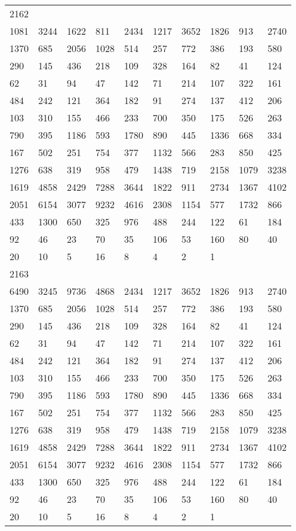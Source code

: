 \begin{longtable}{*{10}{l}}
2162&&&&&&&&&\\
1081& 3244& 1622& 811& 2434& 1217& 3652& 1826& 913& 2740\\
1370& 685& 2056& 1028& 514& 257& 772& 386& 193& 580\\
290& 145& 436& 218& 109& 328& 164& 82& 41& 124\\
62& 31& 94& 47& 142& 71& 214& 107& 322& 161\\
484& 242& 121& 364& 182& 91& 274& 137& 412& 206\\
103& 310& 155& 466& 233& 700& 350& 175& 526& 263\\
790& 395& 1186& 593& 1780& 890& 445& 1336& 668& 334\\
167& 502& 251& 754& 377& 1132& 566& 283& 850& 425\\
1276& 638& 319& 958& 479& 1438& 719& 2158& 1079& 3238\\
1619& 4858& 2429& 7288& 3644& 1822& 911& 2734& 1367& 4102\\
2051& 6154& 3077& 9232& 4616& 2308& 1154& 577& 1732& 866\\
433& 1300& 650& 325& 976& 488& 244& 122& 61& 184\\
92& 46& 23& 70& 35& 106& 53& 160& 80& 40\\
20& 10& 5& 16& 8& 4& 2& 1& \\

2163&&&&&&&&&\\
6490& 3245& 9736& 4868& 2434& 1217& 3652& 1826& 913& 2740\\
1370& 685& 2056& 1028& 514& 257& 772& 386& 193& 580\\
290& 145& 436& 218& 109& 328& 164& 82& 41& 124\\
62& 31& 94& 47& 142& 71& 214& 107& 322& 161\\
484& 242& 121& 364& 182& 91& 274& 137& 412& 206\\
103& 310& 155& 466& 233& 700& 350& 175& 526& 263\\
790& 395& 1186& 593& 1780& 890& 445& 1336& 668& 334\\
167& 502& 251& 754& 377& 1132& 566& 283& 850& 425\\
1276& 638& 319& 958& 479& 1438& 719& 2158& 1079& 3238\\
1619& 4858& 2429& 7288& 3644& 1822& 911& 2734& 1367& 4102\\
2051& 6154& 3077& 9232& 4616& 2308& 1154& 577& 1732& 866\\
433& 1300& 650& 325& 976& 488& 244& 122& 61& 184\\
92& 46& 23& 70& 35& 106& 53& 160& 80& 40\\
20& 10& 5& 16& 8& 4& 2& 1& \\


\end{longtable}
